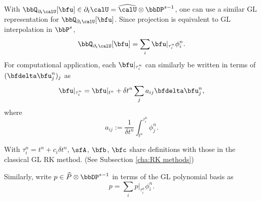 \begin{example}
        With $\bbQ_{\partial_{t}\calU}[\bfu] \in \partial_{t}\calU = \widehat{\calU}\otimes\bbDP^{s - 1}$, one can use a similar GL representation for $\bbQ_{\partial_{t}\calU}[\bfu]$. Since projection is equivalent to GL interpolation in $\bbP^{s}$,
        \begin{equation}
            \bbQ_{\partial_{t}\calU}[\bfu]  =  \sum_{i}\bfu|_{\tau^{n}_{i}}\phi^{n}_{i}.
        \end{equation}
        For computational application, each $\bfu|_{\tau^{n}_{i}}$ can similarly be written in terms of $(\bfdelta\bfu^{n}_{j})_{j}$ as
        \begin{equation}
            \bfu|_{\tau^{n}_{i}}  =  \bfu|_{t^{n}} + \delta t^{n}\sum_{j}a_{ij}\bfdelta\bfu^{n}_{j},
        \end{equation}
        where
        \begin{equation}\label{eqn:a_ij definition}
            a_{ij}  :=  \frac{1}{\delta t^{n}}\int_{t^{n}}^{\tau^{n}_{i}}\phi^{n}_{j}.
        \end{equation}
        
        With $\tau^{n}_{i} = t^{n} + c_{i}\delta t^{n}$, $\sfA$, $\bfb$, $\bfc$ share definitions with those in the classical GL RK method. (See Subsection \ref{cha:RK methods})

        Similarly, write $p \in \widehat{P}\otimes\bbDP^{s - 1}$ in terms of the GL polynomial basis as
        \begin{equation}
            p  =  \sum_{i}p|_{\tau^{n}_{i}}\phi^{n}_{i}.
        \end{equation}


\end{example}

